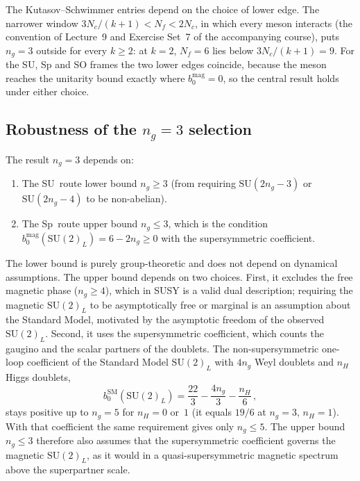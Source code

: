 \documentclass[11pt,a4paper]{article}
\theoremstyle{plain}
\theoremstyle{definition}
\theoremstyle{remark}
\newcommand{\Nc}{N_{\!c}}
\newcommand{\Nf}{N_{\!f}}
\newcommand{\ngen}{n_g}
\newcommand{\SU}[1]{\mathrm{SU}(#1)}
\newcommand{\SM}{\ensuremath{\mathrm{SM}}}
\begin{document}
The Kutasov--Schwimmer entries depend on the choice of lower edge.  The
narrower window $3\Nc/(k+1) < \Nf < 2\Nc$, in which every meson
interacts (the convention of Lecture~9 and Exercise Set~7 of the
accompanying course), puts $\ngen = 3$ outside for every $k \geq 2$: at
$k = 2$, $\Nf = 6$ lies below $3\Nc/(k+1) = 9$.  For the SU, Sp and SO
frames the two lower edges coincide, because the meson reaches the
unitarity bound exactly where $b_0^{\mathrm{mag}} = 0$, so the central
result holds under either choice.

\subsection{Robustness of the $\ngen = 3$ selection}
\label{ssec:robustness}

The result $\ngen = 3$ depends on:
\begin{enumerate}
  \item The SU~route lower bound $\ngen \geq 3$ (from requiring
    $\SU{2\ngen - 3}$ or $\SU{2\ngen - 4}$ to be non-abelian).
  \item The Sp~route upper bound $\ngen \leq 3$, which is the condition
    $b_0^{\mathrm{mag}}(\SU{2}_L) = 6 - 2\ngen \geq 0$ with the
    supersymmetric coefficient.
\end{enumerate}
The lower bound is purely group-theoretic and does not depend on
dynamical assumptions.  The upper bound depends on two choices.  First,
it excludes the free magnetic phase ($\ngen \geq 4$), which in SUSY is a
valid dual description; requiring the magnetic $\SU{2}_L$ to be
asymptotically free or marginal is an assumption about the Standard
Model, motivated by the asymptotic freedom of the observed $\SU{2}_L$.
Second, it uses the supersymmetric coefficient, which counts the gaugino
and the scalar partners of the doublets.  The non-supersymmetric one-loop
coefficient of the Standard Model $\SU{2}_L$ with $4\ngen$ Weyl doublets
and $n_H$ Higgs doublets,
\begin{equation}\label{eq:SM-b0}
  b_0^{\SM}(\SU{2}_L) = \frac{22}{3} - \frac{4\ngen}{3} - \frac{n_H}{6}\,,
\end{equation}
stays positive up to $\ngen = 5$ for $n_H = 0$ or~$1$ (it equals $19/6$
at $\ngen = 3$, $n_H = 1$).  With that coefficient the same requirement
gives only $\ngen \leq 5$.  The upper bound $\ngen \leq 3$ therefore also
assumes that the supersymmetric coefficient governs the magnetic
$\SU{2}_L$, as it would in a quasi-supersymmetric magnetic spectrum above
the superpartner scale.
\end{document}

